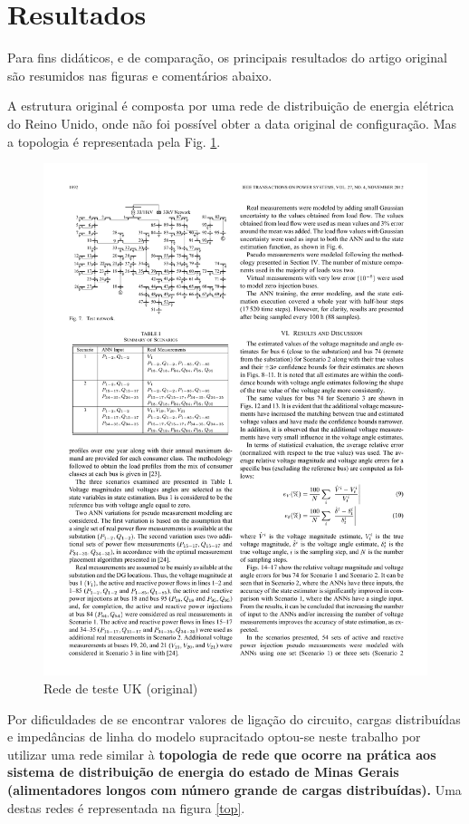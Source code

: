 \documentclass{IEEEtran}
\begin{document}
\section{Resultados}
Para fins didáticos, e de comparação, os principais resultados do artigo original são resumidos nas figuras e comentários abaixo.

A estrutura original é composta por uma rede de distribuição de energia elétrica do Reino Unido, onde não foi possível obter a data original de configuração. Mas a topologia é representada pela Fig. \ref{top_uk}.

\begin{figure}
	\centering
	\includegraphics{topologia_UK.pdf}
	\caption{Rede de teste UK (original)}
	\label{top_uk}
\end{figure}

Por dificuldades de se encontrar valores de ligação do circuito, cargas distribuídas e impedâncias de linha do modelo supracitado optou-se neste trabalho por utilizar uma rede similar à \textbf{topologia de rede que ocorre na prática aos sistema de distribuição de energia do estado de Minas Gerais (alimentadores longos com número grande de cargas distribuídas).} Uma destas redes é representada na figura \ref{top}.
\end{document}
